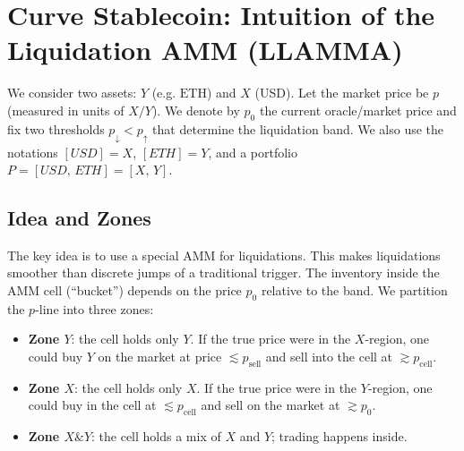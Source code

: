 \documentclass[notitlepage]{revtex4-2}
\begin{document}
\section*{Curve Stablecoin: Intuition of the Liquidation AMM (LLAMMA)}

\bigskip

We consider two assets: \(Y\) (e.g. \(\mathrm{ETH}\)) and \(X\) (USD). Let the market price be
\(p\) (measured in units of \(X/Y\)). We denote by \(p_0\) the current oracle/market price and
fix two thresholds \(p_\downarrow < p_\uparrow\) that determine the liquidation band.
We also use the notations
\([USD]=X\), \([ETH]=Y\), and a portfolio \(P=[USD,\,ETH]=[X,\,Y]\).

\subsection*{Idea and Zones}

\begin{center}
\end{center}

The key idea is to use a special AMM for liquidations.
This makes liquidations smoother than discrete jumps of a traditional trigger.
The inventory inside the AMM cell (``bucket'') depends on the price \(p_0\) relative to the band.
We partition the \(p\)-line into three zones:

\begin{itemize}
  \item \textbf{Zone \(Y\)}: the cell holds only \(Y\).
        If the true price were in the \(X\)-region, one could buy \(Y\) on the market at
        price \(\lesssim p_{\mathrm{sell}}\) and sell into the cell at \(\gtrsim p_{\mathrm{cell}}\).
  \item \textbf{Zone \(X\)}: the cell holds only \(X\).
        If the true price were in the \(Y\)-region, one could buy in the cell at
        \(\lesssim p_{\mathrm{cell}}\) and sell on the market at \(\gtrsim p_0\).
  \item \textbf{Zone \(X\&Y\)}: the cell holds a mix of \(X\) and \(Y\); trading happens inside.
\end{itemize}
\end{document}
